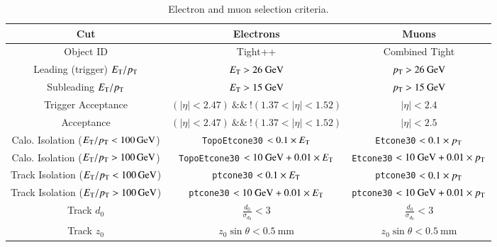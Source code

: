 \begin{table}[h]
	\centering
	\scriptsize
	\begin{tabular}{ccc}
		Cut & Electrons & Muons \\
		\hline
		Object ID & Tight++ & Combined Tight \\
		Leading (trigger) $E_{\text{T}}/p_{\text{T}}$ & $E_{\text{T}}>26~\mbox{GeV}$ & $p_{\text{T}}>26~\mbox{GeV}$ \\
		Subleading $E_{\text{T}}/p_{\text{T}}$ & $E_{\text{T}}>15~\mbox{GeV}$ & $p_{\text{T}}>15~\mbox{GeV}$ \\
		Trigger Acceptance & $(|\eta|<2.47)\ \&\&\ !(1.37<|\eta|<1.52)$ & $|\eta|<2.4$ \\
		Acceptance & $(|\eta|<2.47)\ \&\&\ !(1.37<|\eta|<1.52)$ & $|\eta|<2.5$ \\
		Calo. Isolation ($E_{\text{T}}/p_{\text{T}}<\SI{100}{\giga\electronvolt}$) & \verb.TopoEtcone30. $<0.1\times E_{\text{T}}$  & \verb.Etcone30. $<0.1\times p_{\text{T}}$ \\
		Calo. Isolation ($E_{\text{T}}/p_{\text{T}}>\SI{100}{\giga\electronvolt}$) & \verb.TopoEtcone30. $<10~\mbox{GeV}+0.01\times E_{\text{T}}$ & \verb.Etcone30. $<10~\mbox{GeV}+0.01\times p_{\text{T}} $ \\
		Track Isolation ($E_{\text{T}}/p_{\text{T}}<\SI{100}{\giga\electronvolt}$) & \verb.ptcone30. $< 0.1\times E_{\text{T}} $ & \verb.ptcone30. $<0.1\times p_{\text{T}}$ \\
		Track Isolation ($E_{\text{T}}/p_{\text{T}}>\SI{100}{\giga\electronvolt}$) & \verb.ptcone30. $<10~\mbox{GeV}+0.01\times E_{\text{T}}$ & \verb.ptcone30. $<10~\mbox{GeV}+0.01\times p_{\text{T}} $ \\
		Track $d_0$ & $\frac{d_0}{\sigma_{d_0}}<3$  & $\frac{d_0}{\sigma_{d_0}}<3$  \\
		Track $z_0$ & $z_0\sin\theta<0.5~\mbox{mm}$ & $z_0\sin\theta<0.5~\mbox{mm}$  \\
	\end{tabular}
	\caption{Electron and muon selection criteria.}
	\label{table:electron-muon-selections}
\end{table}

